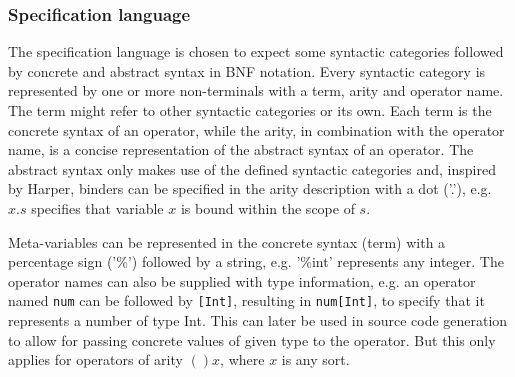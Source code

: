 \subsubsection{Specification language}

The specification language is chosen to expect some syntactic categories followed by concrete and abstract syntax in BNF notation.  %
Every syntactic category is represented by one or more non-terminals with a term, arity and operator name. The term might refer to other syntactic categories or its own. Each term is the concrete syntax of an operator, while the arity, in combination with the operator name, is a concise representation of the abstract syntax of an operator.
The abstract syntax only makes use of the defined syntactic categories and, inspired by Harper\cite{harper}, binders can be specified in the arity description with a dot ('.'), e.g. $x.s$ specifies that variable $x$ is bound within the scope of $s$.

Meta-variables can be represented in the concrete syntax (term) with a percentage sign ('\%') followed by a string, e.g. '\%int' represents any integer. The operator
names can also be supplied with type information, e.g. an operator named
\texttt{num} can be followed by \texttt{[Int]}, resulting in \texttt{num[Int]}, to specify that it represents a number of type Int. This can later be used in source code generation to allow for passing concrete values of given type to the operator. But this only applies for operators of arity $()x$, where $x$ is any sort.


